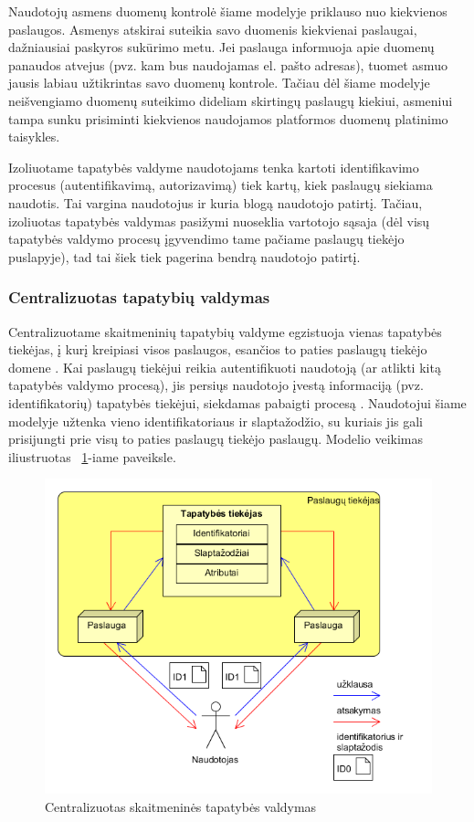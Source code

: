 Naudotojų asmens duomenų kontrolė šiame modelyje priklauso nuo kiekvienos paslaugos. Asmenys atskirai suteikia savo duomenis
kiekvienai paslaugai, dažniausiai paskyros sukūrimo metu. Jei paslauga informuoja apie duomenų panaudos atvejus (pvz. kam bus naudojamas
el. pašto adresas), tuomet asmuo jausis labiau užtikrintas savo duomenų kontrole. Tačiau dėl šiame modelyje neišvengiamo duomenų suteikimo
dideliam skirtingų paslaugų kiekiui, asmeniui tampa sunku prisiminti kiekvienos naudojamos platformos duomenų platinimo taisykles.

Izoliuotame tapatybės valdyme naudotojams tenka kartoti identifikavimo procesus (autentifikavimą, autorizavimą) tiek kartų, kiek paslaugų siekiama
naudotis. Tai vargina naudotojus ir kuria blogą naudotojo patirtį. Tačiau, izoliuotas tapatybės valdymas pasižymi nuoseklia vartotojo sąsaja (dėl 
visų tapatybės valdymo procesų įgyvendimo tame pačiame paslaugų tiekėjo puslapyje), tad tai šiek tiek pagerina bendrą naudotojo patirtį.

\subsubsection{Centralizuotas tapatybių valdymas}

Centralizuotame skaitmeninių tapatybių valdyme egzistuoja vienas tapatybės tiekėjas, į kurį kreipiasi visos paslaugos,
esančios to paties paslaugų tiekėjo domene \cite{Josang2005}. Kai paslaugų tiekėjui
reikia autentifikuoti naudotoją (ar atlikti kitą tapatybės valdymo procesą), jis persiųs naudotojo įvestą informaciją (pvz. identifikatorių) tapatybės tiekėjui,
siekdamas pabaigti procesą \cite{Cao2010}. Naudotojui šiame modelyje užtenka vieno identifikatoriaus ir slaptažodžio, su kuriais jis gali prisijungti prie visų to paties
paslaugų tiekėjo paslaugų. Modelio veikimas iliustruotas ~\ref{fig:isolatedModel}-iame paveiksle.

\begin{figure}[H]
    \centering
    \includegraphics[scale=0.8]{img/centralizedModel}
    \caption{Centralizuotas skaitmeninės tapatybės valdymas \cite{Cao2010}}
    \label{fig:isolatedModel}
\end{figure}

